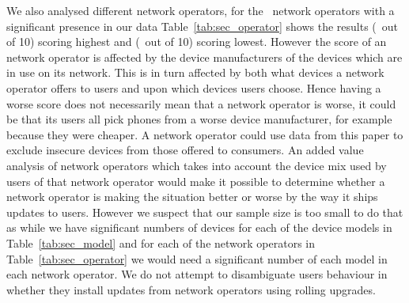 \daTabSecScoresoperator
We also analysed different network operators, for the \daNumSigOperators\ network operators with a significant presence in our data Table~\ref{tab:sec_operator} shows the results \emph{\daSecScoreBestoperator} (\daSecScoreBestoperatorScore\ out of 10) scoring highest and \emph{\daSecScoreWorstoperator} (\daSecScoreWorstoperatorScore\ out of 10) scoring lowest.
However the score of an network operator is affected by the device manufacturers of the devices which are in use on its network.
This is in turn affected by both what devices a network operator offers to users and upon which devices users choose.
Hence having a worse score does not necessarily mean that a network operator is worse, it could be that its users all pick phones from a worse device manufacturer, for example because they were cheaper.
A network operator could use data from this paper to exclude insecure devices from those offered to consumers.
An added value analysis of network operators which takes into account the device mix used by users of that network operator would make it possible to determine whether a network operator is making the situation better or worse by the way it ships updates to users.
However we suspect that our sample size is too small to do that as while we have significant numbers of devices for each of the device models in Table~\ref{tab:sec_model} and for each of the network operators in Table~\ref{tab:sec_operator} we would need a significant number of each model in each network operator.
We do not attempt to disambiguate users behaviour in whether they install updates from network operators using rolling upgrades.


